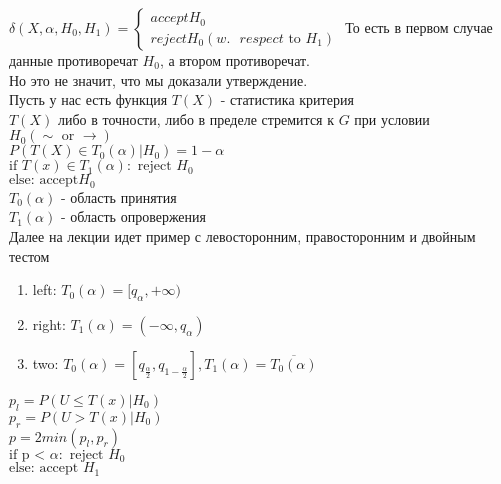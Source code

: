 \documentclass{article}
\newcommand\0{\mathbb{0}}
\newcommand\1{\mathbb{1}}
\begin{document}
$\delta(X, \alpha, H_0, H_1) = \begin{cases}
    accept H_0\\
    reject H_0 (w.\text{ } respect\text{ to } H_1)
\end{cases}$
То есть в первом случае данные противоречат $H_0$, а втором противоречат.\\
Но это не значит, что мы доказали утверждение.\\
Пусть у нас есть функция $T(X)$ - статистика критерия\\
$T(X)$ либо в точности, либо в пределе стремится к $G$ при условии $H_0 (\sim \text{ or } \to)$\\
$P(T(X) \in T_0(\alpha) | H_0) = 1 - \alpha$\\
$\text{if } T(x) \in T_1(\alpha): \text{ reject } H_0$\\
$\text{else: accept} H_0$\\
$T_0(\alpha)$ - область принятия\\
$T_1(\alpha)$ - область опровержения\\
Далее на лекции идет пример с левосторонним, правосторонним и двойным тестом\\
\begin{enumerate}
    \item left: $T_0(\alpha) = [q_\alpha, +\infty)$
    \item right: $T_1(\alpha) = (-\infty, q_\alpha)$
    \item two: $T_0(\alpha) = [q_{\frac{\alpha}{2}}, q_{1 - \frac{\alpha}{2}}], T_1(\alpha) = \overline{T_0(\alpha)}$
\end{enumerate}
$p_l = P(U \leq T(x) | H_0)$\\
$p_r = P(U > T(x) | H_0)$\\
$p = 2min(p_l, p_r)$\\
$\text{if p < } \alpha: \text{ reject }H_0$\\
$\text{else: accept }H_1$\\
\end{document}
